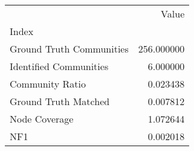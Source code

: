 \begin{tabular}{lr}
\toprule
{} &       Value \\
Index                    &             \\
\midrule
Ground Truth Communities &  256.000000 \\
Identified Communities   &    6.000000 \\
Community Ratio          &    0.023438 \\
Ground Truth Matched     &    0.007812 \\
Node Coverage            &    1.072644 \\
NF1                      &    0.002018 \\
\bottomrule
\end{tabular}
